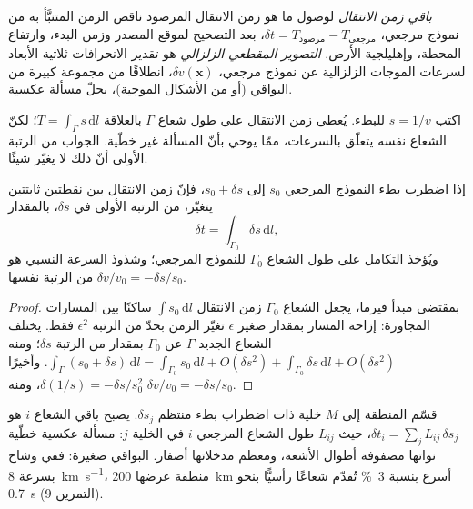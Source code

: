 \begin{definition}\label{def:b3:seismology-imaging:tomography}
\emph{باقي زمن الانتقال} لوصول ما هو
زمن الانتقال المرصود ناقص الزمن المتنبَّأ به من نموذج مرجعي،
$\delta t = T_{\text{مرصود}} - T_{\text{مرجعي}}$، بعد التصحيح لموقع المصدر وزمن البدء،
وارتفاع المحطة، وإهليلجية الأرض.
\emph{التصوير المقطعي الزلزالي} هو
تقدير الانحرافات ثلاثية الأبعاد لسرعات الموجات الزلزالية عن
نموذج مرجعي، $\delta v(\mathbf x)$، انطلاقًا من مجموعة كبيرة من البواقي (أو من
الأشكال الموجية)، بحلّ مسألة عكسية.
\end{definition}

اكتب $s = 1/v$ للبطء. يُعطى زمن الانتقال على طول شعاع $\Gamma$ بالعلاقة
$T = \int_\Gamma s\,\mathrm dl$؛ لكنّ الشعاع نفسه يتعلّق بالسرعات،
ممّا يوحي بأنّ المسألة غير خطّية. الجواب من الرتبة الأولى أنّ
ذلك لا يغيّر شيئًا.

\begin{proposition}\label{prop:b3:seismology-imaging:linear}
إذا اضطرب بطء النموذج المرجعي $s_0$ إلى $s_0 + \delta s$،
فإنّ زمن الانتقال بين نقطتين ثابتتين يتغيّر، من الرتبة الأولى في
$\delta s$، بالمقدار
\[
  \delta t = \int_{\Gamma_0}\delta s\,\mathrm dl ,
\]
ويُؤخذ التكامل على طول الشعاع $\Gamma_0$ للنموذج المرجعي؛
وشذوذ السرعة النسبي هو $\delta v/v_0 = -\delta s/s_0$ من الرتبة نفسها.
\end{proposition}

\begin{proof}
بمقتضى مبدأ فيرما، يجعل الشعاع $\Gamma_0$ زمن الانتقال
$\int s_0\,\mathrm dl$ ساكنًا بين المسارات المجاورة: إزاحة المسار بمقدار
صغير $\epsilon$ تغيّر الزمن بحدّ من الرتبة $\epsilon^2$ فقط.
يختلف الشعاع الجديد $\Gamma$ عن $\Gamma_0$ بمقدار من الرتبة $\delta s$؛
ومنه $\int_\Gamma(s_0 + \delta s)\,\mathrm dl = \int_{\Gamma_0}s_0\,\mathrm dl +
O(\delta s^2) + \int_{\Gamma_0}\delta s\,\mathrm dl + O(\delta s^2)$. وأخيرًا
$\delta(1/s) = -\delta s/s_0^2$، ومنه $\delta v/v_0 = -\delta s/s_0$.
\end{proof}

قسّم المنطقة إلى $M$ خلية ذات اضطراب بطء منتظم $\delta s_j$.
يصبح باقي الشعاع $i$ هو $\delta t_i = \sum_j L_{ij}\,\delta s_j$، حيث
$L_{ij}$ طول الشعاع المرجعي $i$ في الخلية $j$: مسألة عكسية خطّية
نواتها مصفوفة أطوال الأشعة، ومعظم مدخلاتها أصفار.
البواقي صغيرة: ففي وشاح بسرعة
\qty{8}{km.s^{-1}}، منطقة عرضها \qty{200}{km} أسرع بنسبة \qty{3}{\percent}
تُقدّم شعاعًا رأسيًّا بنحو \qty{0.7}{s} (التمرين 9).

